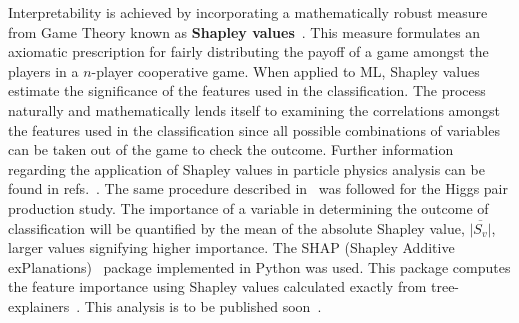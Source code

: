 Interpretability is achieved by incorporating a mathematically robust measure from  Game Theory known as \textbf{Shapley values}~\cite{shapley1951notes}. This measure formulates an axiomatic prescription for fairly distributing the payoff of a game amongst the players in a $n$-player cooperative game. When applied to ML, Shapley values estimate the significance of the features used in the classification. The process naturally and mathematically lends itself to examining the correlations amongst the features used in the classification since all possible combinations of variables can be taken out of the game to check the outcome. Further information regarding the application of Shapley values in particle physics analysis can be found in refs.~\cite{Grojean:2020ech,Alvestad:2021sje,Cornell:2021gut}.  The same procedure described in~\cite{Grojean:2020ech} was followed for the Higgs pair production study. The importance of a variable in determining the outcome of classification will be quantified by the mean of the absolute Shapley value, $\overline{|S_v|}$, larger values signifying higher importance. The SHAP (Shapley Additive exPlanations)~\cite{NIPS2017_7062} package implemented in Python was used. This package computes the feature importance using Shapley values calculated exactly from  tree-explainers~\cite{2018arXiv180203888L, Lundberg:2020vt}. This analysis is to be published soon~\cite{IML}.
